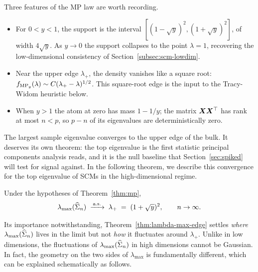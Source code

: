 Three features of the MP law are worth recording.
\begin{itemize}[leftmargin=*,itemsep=0.3em]
  \item For \(0 < y < 1\), the support is the interval \([(1 - \sqrt{y})^2, (1 + \sqrt{y})^2]\), of width \(4 \sqrt{y}\). As \(y \to 0\) the support collapses to the point \(\lambda = 1\), recovering the low-dimensional consistency of Section~\ref{subsec:scm-lowdim}.
  \item Near the upper edge \(\lambda_+\), the density vanishes like a square root: \(f_{\mathrm{MP}_y}(\lambda) \sim C(\lambda_+ - \lambda)^{1/2}\). This square-root edge is the input to the Tracy-Widom heuristic below.
  \item When \(y > 1\) the atom at zero has mass \(1 - 1/y\); the matrix \(\bm{X} \bm{X}^{\top}\) has rank at most \(n < p\), so \(p - n\) of its eigenvalues are deterministically zero.
\end{itemize}

The largest sample eigenvalue converges to the upper edge of the bulk. It deserves its own theorem: the top eigenvalue is the first statistic principal components analysis reads, and it is the null baseline that Section~\ref{sec:spiked} will test for signal against. In the following theorem, we describe this convergence for the top eigenvalue of SCMs in the high-dimensional regime.
\begin{theorem}\label{thm:lambda-max-edge}
Under the hypotheses of Theorem~\ref{thm:mp},
\[
  \lambda_{\max}(\widehat{\Sigma}_n) \;\xrightarrow{\,\text{a.s.}\,}\; \lambda_+ \;=\; (1 + \sqrt{y})^2, \qquad n \to \infty.
\]
\end{theorem}

Its importance notwithstanding, Theorem~\ref{thm:lambda-max-edge} settles \emph{where} \(\lambda_{\max}(\widehat{\Sigma}_n)\) lives in the limit but not \emph{how} it fluctuates around \(\lambda_+\). Unlike in low dimensions, the fluctuations of \(\lambda_{\max}(\widehat{\Sigma}_n)\) in high dimensions cannot be Gaussian. In fact, the geometry on the two sides of \(\lambda_{\max}\) is fundamentally different, which can be explained schematically as follows.

